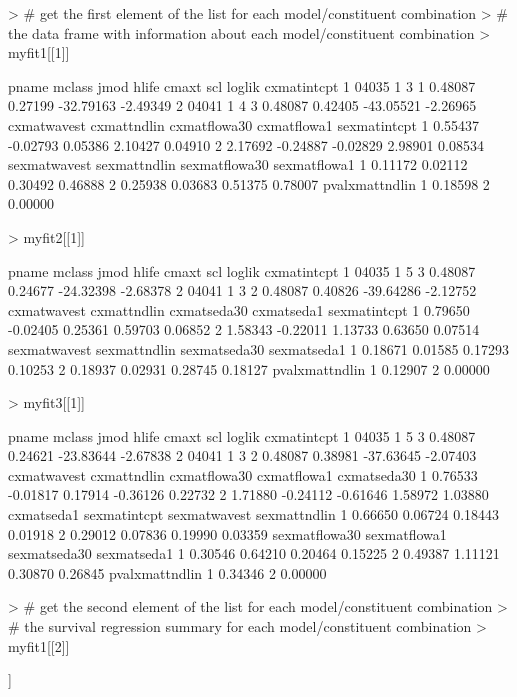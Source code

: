 \documentclass[11pt]{article}
\begin{document}
\begin{Schunk}
\begin{Sinput}
> # get the first element of the list for each model/constituent combination
> # the data frame with information about each model/constituent combination
> myfit1[[1]]
\end{Sinput}
\begin{Soutput}
  pname mclass jmod hlife   cmaxt     scl    loglik cxmatintcpt
1 04035      1    3     1 0.48087 0.27199 -32.79163    -2.49349
2 04041      1    4     3 0.48087 0.42405 -43.05521    -2.26965
  cxmatwavest cxmattndlin cxmatflowa30 cxmatflowa1 sexmatintcpt
1     0.55437    -0.02793      0.05386     2.10427      0.04910
2     2.17692    -0.24887     -0.02829     2.98901      0.08534
  sexmatwavest sexmattndlin sexmatflowa30 sexmatflowa1
1      0.11172      0.02112       0.30492      0.46888
2      0.25938      0.03683       0.51375      0.78007
  pvalxmattndlin
1        0.18598
2        0.00000
\end{Soutput}
\begin{Sinput}
> myfit2[[1]]
\end{Sinput}
\begin{Soutput}
  pname mclass jmod hlife   cmaxt     scl    loglik cxmatintcpt
1 04035      1    5     3 0.48087 0.24677 -24.32398    -2.68378
2 04041      1    3     2 0.48087 0.40826 -39.64286    -2.12752
  cxmatwavest cxmattndlin cxmatseda30 cxmatseda1 sexmatintcpt
1     0.79650    -0.02405     0.25361    0.59703      0.06852
2     1.58343    -0.22011     1.13733    0.63650      0.07514
  sexmatwavest sexmattndlin sexmatseda30 sexmatseda1
1      0.18671      0.01585      0.17293     0.10253
2      0.18937      0.02931      0.28745     0.18127
  pvalxmattndlin
1        0.12907
2        0.00000
\end{Soutput}
\begin{Sinput}
> myfit3[[1]]
\end{Sinput}
\begin{Soutput}
  pname mclass jmod hlife   cmaxt     scl    loglik cxmatintcpt
1 04035      1    5     3 0.48087 0.24621 -23.83644    -2.67838
2 04041      1    3     2 0.48087 0.38981 -37.63645    -2.07403
  cxmatwavest cxmattndlin cxmatflowa30 cxmatflowa1 cxmatseda30
1     0.76533    -0.01817      0.17914    -0.36126     0.22732
2     1.71880    -0.24112     -0.61646     1.58972     1.03880
  cxmatseda1 sexmatintcpt sexmatwavest sexmattndlin
1    0.66650      0.06724      0.18443      0.01918
2    0.29012      0.07836      0.19990      0.03359
  sexmatflowa30 sexmatflowa1 sexmatseda30 sexmatseda1
1       0.30546      0.64210      0.20464     0.15225
2       0.49387      1.11121      0.30870     0.26845
  pvalxmattndlin
1        0.34346
2        0.00000
\end{Soutput}
\begin{Sinput}
> # get the second element of the list for each model/constituent combination
> # the survival regression summary for each model/constituent combination
> myfit1[[2]]
\end{Sinput}
\begin{Soutput}
[[1]]


\end{Soutput}
\end{Schunk}
\end{document}
